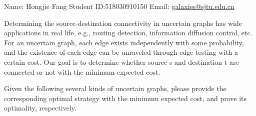 \documentclass{oxmathproblems}
\theoremstyle{definition}
\begin{document}
\begin{center}
	Name: Hongjie Fang \quad Student ID:518030910150 \quad Email: \href{mailto:galaxies@sjtu.edu.cn}{galaxies@sjtu.edu.cn}
\end{center}
Determining the source-destination connectivity in uncertain graphs has wide applications in real life, e.g., routing detection, information diffusion control, etc. For an uncertain graph, each edge exists independently with some probability, and the existence of each edge can be unraveled through edge testing with a certain cost. Our goal is to determine whether source s and destination t are connected or not with the minimum expected cost.
	
Given the following several kinds of uncertain graphs, please provide the corresponding optimal strategy with the minimum expected cost, and prove its optimality, respectively.
\end{document}

